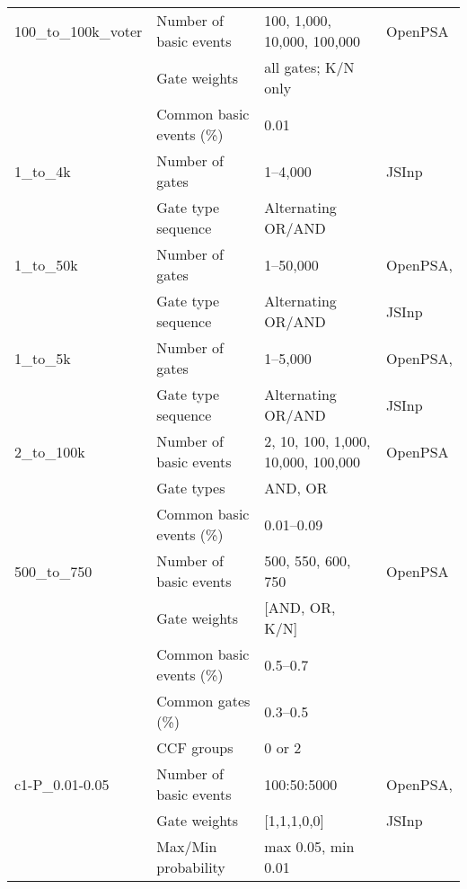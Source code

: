 \begin{longtable}{@{}llll@{}}
100\_to\_100k\_voter & Number of basic events & 100, 1,000, 10,000, 100,000 & OpenPSA \\
                     & Gate weights          & all gates; K/N only          &               \\
                     & Common basic events (\%) & 0.01                      &               \\
\midrule
1\_to\_4k & Number of gates   & 1--4,000                     & JSInp \\
                         & Gate type sequence & Alternating OR/AND           &                 \\
\midrule
1\_to\_50k           & Number of gates       & 1--50,000                     & OpenPSA,\\
                     & Gate type sequence    & Alternating OR/AND            & JSInp   \\
\midrule
1\_to\_5k            & Number of gates       & 1--5,000                      & OpenPSA,\\
                     & Gate type sequence    & Alternating OR/AND            & JSInp   \\
\midrule
2\_to\_100k          & Number of basic events & 2, 10, 100, 1,000, 10,000, 100,000 & OpenPSA \\
                     & Gate types            & AND, OR                       &                 \\
                     & Common basic events (\%) & 0.01--0.09                 &                 \\
\midrule
500\_to\_750         & Number of basic events & 500, 550, 600, 750            & OpenPSA \\
                     & Gate weights           & [AND, OR, K/N]                &          \\
                     & Common basic events (\%) & 0.5--0.7                    &          \\
                     & Common gates (\%)      & 0.3--0.5                      &          \\
                     & CCF groups             & 0 or 2                        &          \\
\midrule
c1-P\_0.01-0.05      & Number of basic events & 100:50:5000                   & OpenPSA,\\
                     & Gate weights           & [1,1,1,0,0]                   & JSInp   \\
                     & Max/Min probability    & max 0.05, min 0.01            &                 \\

\end{longtable}
